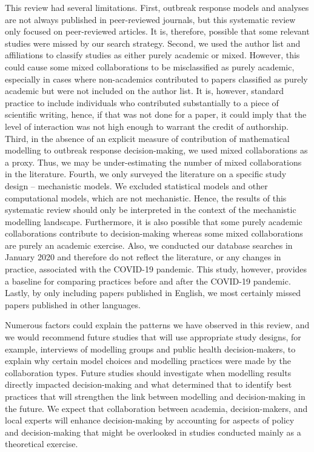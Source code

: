 \documentclass[10pt,letterpaper]{article}
\begin{document}
This review had several limitations. First, outbreak response models and analyses are not always published in peer-reviewed journals, but this systematic review only focused on peer-reviewed articles. It is, therefore, possible that some relevant studies were missed by our search strategy. Second, we used the author list and affiliations to classify studies as either purely academic or mixed. However, this could cause some mixed collaborations to be misclassified as purely academic, especially in cases where non-academics contributed to papers classified as purely academic but were not included on the author list. It is, however, standard practice to include individuals who contributed substantially to a piece of scientific writing, hence, if that was not done for a paper, it could imply that the level of interaction was not high enough to warrant the credit of authorship. Third, in the absence of an explicit measure of contribution of mathematical modelling to outbreak response decision-making, we used mixed collaborations as a proxy. Thus, we may be under-estimating the number of mixed collaborations in the literature. Fourth, we only surveyed the literature on a specific study design – mechanistic models. We excluded statistical models and other computational models, which are not mechanistic. Hence, the results of this systematic review should only be interpreted in the context of the mechanistic modelling landscape. Furthermore, it is also possible that some purely academic collaborations contribute to decision-making whereas some mixed collaborations are purely an academic exercise. Also, we  conducted our database searches in January 2020 and therefore do not reflect the literature, or any changes in practice, associated with the COVID-19 pandemic. This study, however, provides a baseline for comparing practices before and after the COVID-19 pandemic. Lastly, by only including papers published in English, we most certainly missed papers published in other languages.  

Numerous factors could explain the patterns we have observed in this review, and we would recommend future studies that will use appropriate study designs, for example, interviews of modelling groups and public health decision-makers, to explain why certain model choices and modelling practices were made by the collaboration types. Future studies should investigate when modelling results directly impacted decision-making and what determined that to identify best practices that will strengthen the link between modelling and decision-making in the future. We expect that collaboration between academia, decision-makers, and local experts will enhance decision-making by accounting for aspects of policy and decision-making that might be overlooked in studies conducted mainly as a theoretical exercise. 
\end{document}
